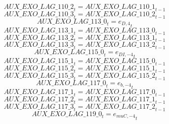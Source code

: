 \begin{dmath}
{AUX\_EXO\_LAG\_110\_2}_{t}={AUX\_EXO\_LAG\_110\_1}_{t-1}
\end{dmath}
\begin{dmath}
{AUX\_EXO\_LAG\_110\_3}_{t}={AUX\_EXO\_LAG\_110\_2}_{t-1}
\end{dmath}
\begin{dmath}
{AUX\_EXO\_LAG\_113\_0}_{t}={{e_{D,4}}}_{t}
\end{dmath}
\begin{dmath}
{AUX\_EXO\_LAG\_113\_1}_{t}={AUX\_EXO\_LAG\_113\_0}_{t-1}
\end{dmath}
\begin{dmath}
{AUX\_EXO\_LAG\_113\_2}_{t}={AUX\_EXO\_LAG\_113\_1}_{t-1}
\end{dmath}
\begin{dmath}
{AUX\_EXO\_LAG\_113\_3}_{t}={AUX\_EXO\_LAG\_113\_2}_{t-1}
\end{dmath}
\begin{dmath}
{AUX\_EXO\_LAG\_115\_0}_{t}={{e_{DI,-4}}}_{t}
\end{dmath}
\begin{dmath}
{AUX\_EXO\_LAG\_115\_1}_{t}={AUX\_EXO\_LAG\_115\_0}_{t-1}
\end{dmath}
\begin{dmath}
{AUX\_EXO\_LAG\_115\_2}_{t}={AUX\_EXO\_LAG\_115\_1}_{t-1}
\end{dmath}
\begin{dmath}
{AUX\_EXO\_LAG\_115\_3}_{t}={AUX\_EXO\_LAG\_115\_2}_{t-1}
\end{dmath}
\begin{dmath}
{AUX\_EXO\_LAG\_117\_0}_{t}={{e_{b,-4}}}_{t}
\end{dmath}
\begin{dmath}
{AUX\_EXO\_LAG\_117\_1}_{t}={AUX\_EXO\_LAG\_117\_0}_{t-1}
\end{dmath}
\begin{dmath}
{AUX\_EXO\_LAG\_117\_2}_{t}={AUX\_EXO\_LAG\_117\_1}_{t-1}
\end{dmath}
\begin{dmath}
{AUX\_EXO\_LAG\_117\_3}_{t}={AUX\_EXO\_LAG\_117\_2}_{t-1}
\end{dmath}
\begin{dmath}
{AUX\_EXO\_LAG\_119\_0}_{t}={{e_{muC,-4}}}_{t}
\end{dmath}

